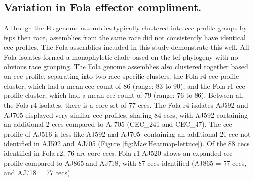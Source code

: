 \subsection{Variation in \acl{Fola} effector compliment.}

Although the \ac{Fo} genome assemblies typically clustered into \ac{cec} profile groups by \acp{fsp} then race, assemblies from the same race did not consistently have identical \ac{cec} profiles. The \ac{Fola} assemblies included in this study demonstrate this well. All \ac{Fola} isolates formed a monophyletic clade based on the \ac{tef} phylogeny with no obvious race grouping. The \ac{Fola} genome assemblies also clustered together based on \ac{cec} profile, separating into two race-specific clusters; the \ac{Fola} \ac{r4} \ac{cec} profile cluster, which had a mean \ac{cec} count of 86  (range: 83 to 90), and the \ac{Fola} \ac{r1} \ac{cec} profile cluster, which had a mean \ac{cec} count of 79 (range: 76 to 86). Between all the \ac{Fola} \ac{r4} isolates, there is a core set of 77 \acp{cec}. The \ac{Fola} \ac{r4} isolates AJ592 and AJ705 displayed very similar \ac{cec} profiles, sharing 84 \acp{cec}, with AJ592 containing an additional 2 \acp{cec} compared to AJ705 (CEC\_241 and CEC\_47). The \ac{cec} profile of AJ516 is less like AJ592 and AJ705, containing an additional 20 \ac{cec} not identified in AJ592 and AJ705 (Figure \ref{fig:MaeiHeatmap-lettuce}). Of the 88 \acp{cec} identified in \ac{Fola} \ac{r2}, 76 are core \acp{cec}. \ac{Fola} \ac{r1} AJ520 shows an expanded \ac{cec} profile compared to AJ865 and AJ718, with 87 \acp{cec} identified (AJ865 = 77 \acp{cec}, and AJ718 = 77 \acp{cec}).

